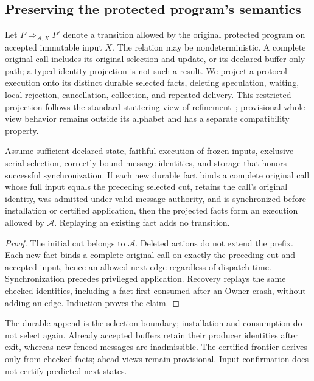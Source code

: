 \subsection{Preserving the protected program's semantics}
\label{subsec:native_refinement}
Let $P \mathrel{\Rightarrow_{\mathcal A,X}} P'$ denote a transition allowed
by the original protected program on accepted immutable input $X$.
The relation may be nondeterministic. A complete original call includes
its original selection and update, or its declared buffer-only path;
a typed identity projection is not such a result. We project a protocol
execution onto its distinct durable selected facts, deleting speculation,
waiting, local rejection, cancellation, collection, and repeated delivery.
This restricted projection follows the standard stuttering view of
refinement~\cite{abadi1991refinement}; provisional whole-view behavior
remains outside its alphabet and has a separate compatibility property.

\begin{proposition}
\label{prop:refinement}
Assume sufficient declared state, faithful execution of frozen inputs,
exclusive serial selection, correctly bound message identities, and
storage that honors successful synchronization. If each new durable fact
binds a complete original call whose full input equals the preceding
selected cut, retains the call's original identity, was admitted under
valid message authority, and is synchronized before installation or certified
application, then the projected facts form an execution allowed by
$\mathcal A$. Replaying an existing fact adds no transition.
\end{proposition}
\begin{proof}
The initial cut belongs to $\mathcal A$. Deleted actions do not extend
the prefix. Each new fact binds a complete original call on exactly the
preceding cut and accepted input, hence an allowed next edge regardless
of dispatch time. Synchronization precedes privileged application.
Recovery replays the same checked identities, including a fact first
consumed after an Owner crash, without adding an edge. Induction proves
the claim.
\end{proof}

The durable append is the selection boundary; installation and consumption
do not select again. Already accepted buffers retain their producer
identities after exit, whereas new fenced messages are inadmissible.
The certified frontier derives only from checked facts; ahead views remain
provisional. Input confirmation does not certify predicted next states.


